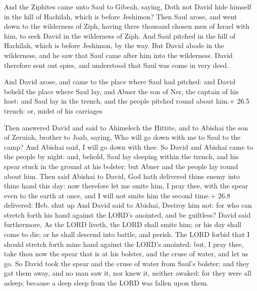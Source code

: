  And the Ziphites came unto Saul to Gibeah, saying, Doth not
David hide himself in the hill of Hachilah, which is before Jeshimon?
 Then Saul arose, and went down to the wilderness of Ziph,
having three thousand chosen men of Israel with him, to seek David in
the wilderness of Ziph.  And Saul pitched in the hill of
Hachilah, which is before Jeshimon, by the way. But David abode in the
wilderness, and he saw that Saul came after him into the wilderness.
 David therefore sent out spies, and understood that Saul
was come in very deed.

 And David arose, and came to the place where Saul had
pitched: and David beheld the place where Saul lay, and Abner the son of
Ner, the captain of his host: and Saul lay in the trench, and the people
pitched round about him.+ 26.5 trench: or, midst of his carriages

 Then answered David and said to Ahimelech the Hittite, and
to Abishai the son of Zeruiah, brother to Joab, saying, Who will go down
with me to Saul to the camp? And Abishai said, I will go down with thee.
 So David and Abishai came to the people by night: and,
behold, Saul lay sleeping within the trench, and his spear stuck in the
ground at his bolster: but Abner and the people lay round about him.
 Then said Abishai to David, God hath delivered thine enemy
into thine hand this day: now therefore let me smite him, I pray thee,
with the spear even to the earth at once, and I will not smite him the
second time.+ 26.8 delivered: Heb. shut up  And David said
to Abishai, Destroy him not: for who can stretch forth his hand against
the LORD's anointed, and be guiltless?  David said
furthermore, As the LORD liveth, the LORD shall smite him; or his day
shall come to die; or he shall descend into battle, and perish.
 The LORD forbid that I should stretch forth mine hand
against the LORD's anointed: but, I pray thee, take thou now the spear
that is at his bolster, and the cruse of water, and let us go.
 So David took the spear and the cruse of water from Saul's
bolster; and they gat them away, and no man saw it, nor knew it, neither
awaked: for they were all asleep; because a deep sleep from the LORD was
fallen upon them.

